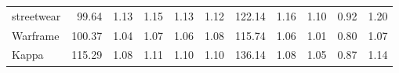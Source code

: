 \begin{tabular}{lrrrrrrrrrr}
streetwear          &          99.64 &                1.13 &                1.15 &                1.13 &                1.12 &                122.14 &                       1.16 &                       1.10 &                       0.92 &                       1.20 \\
Warframe            &         100.37 &                1.04 &                1.07 &                1.06 &                1.08 &                115.74 &                       1.06 &                       1.01 &                       0.80 &                       1.07 \\
Kappa               &         115.29 &                1.08 &                1.11 &                1.10 &                1.10 &                136.14 &                       1.08 &                       1.05 &                       0.87 &                       1.14 \\
\bottomrule
\end{tabular}
